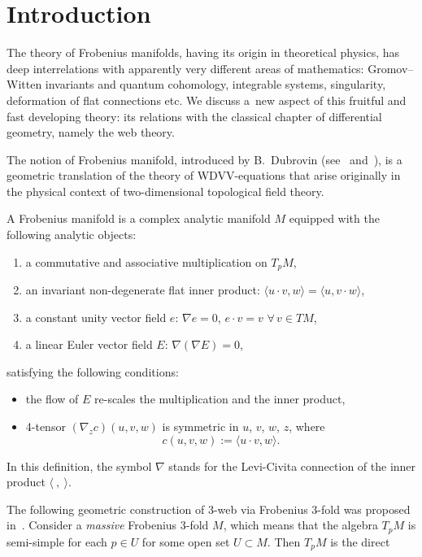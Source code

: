 \section{Introduction}

The theory of Frobenius manifolds, having its origin in theoretical physics, has deep interrelations with apparently very dif\/ferent areas of mathematics: Gromov--Witten invariants and quantum cohomology, integrable systems, singularity, deformation of f\/lat connections etc.
We discuss a~new aspect of this fruitful and fast developing theory: its relations with the classical chapter of dif\/ferential geometry, namely the web theory.

The notion of Frobenius manifold, introduced by B.~Dubrovin (see~\cite{Df} and~\cite{Mf}), is a geometric translation of the theory of WDVV-equations that arise originally in the physical context of two-dimensional topological f\/ield theory.
\begin{definition}\label{defFrob}
A Frobenius manifold is a complex analytic manifold $M$ equipped with the following
analytic objects:
\begin{enumerate}\itemsep=0pt
\item[1)] a commutative and associative multiplication on $T_pM$,
\item[2)] an invariant non-degenerate f\/lat inner product: $\langle u \cdot v, w \rangle = \langle u, v \cdot w \rangle $,
\item[3)] a constant unity vector f\/ield $e$: $\nabla e=0$, $e \cdot v=v$ $\forall\, v\in TM$,
\item[4)] a linear Euler vector f\/ield $E$: $\nabla (\nabla E)=0$,
\end{enumerate}
satisfying the following conditions:
\begin{itemize}\itemsep=0pt
\item the f\/low of $E$ re-scales the
multiplication and the inner product,
\item 4-tensor $(\nabla_z c)(u,v,w)$ is symmetric in
$u$, $v$, $w$, $z$, where
\[
c(u,v,w):=\langle u\cdot v,w\rangle.
\]
\end{itemize}
In this def\/inition, the symbol $\nabla$ stands for the Levi-Civita connection of the inner product $\langle\ ,\ \rangle$.
\end{definition}
The following geometric construction of $3$-web via Frobenius $3$-fold was proposed in~\cite{Aw}.
Consider a {\it massive} Frobenius $3$-fold $M$, which means that the algebra $T_pM$ is semi-simple for each $p\in U$ for some open set $U\subset M$. Then $T_pM$ is the direct
